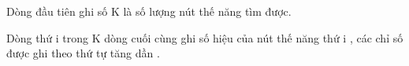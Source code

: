Dòng đầu tiên ghi số K là số lượng nút thế năng tìm được.


Dòng thứ i trong K dòng cuối cùng ghi số hiệu của nút thế năng thứ i , các chỉ số được ghi theo thứ tự tăng dần .
